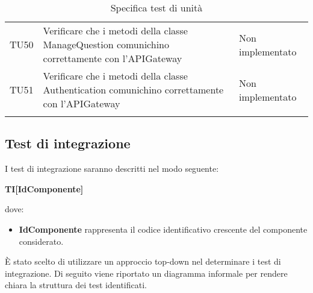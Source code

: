 \documentclass[../PianoDiQualifica.tex]{subfiles}
\begin{document}
\begin{longtable}[c] { >{\centering\arraybackslash}p{4cm} p{7cm} >{\centering\arraybackslash}p{4cm}}
			\addlinespace[0.3em]
			\midrule
			\addlinespace[0.3em]
			TU50 & Verificare che i metodi della classe ManageQuestion comunichino correttamente con l'APIGateway & Non implementato \\
			\addlinespace[0.3em]
			\midrule
			\addlinespace[0.3em]
			TU51 & Verificare che i metodi della classe Authentication comunichino correttamente con l'APIGateway & Non implementato \\ 
		\bottomrule
		\caption{Specifica test di unità}
	\end{longtable}
	
	\newpage
	\subsection{Test di integrazione}
	I test di integrazione saranno descritti nel modo seguente:
	\begin{center}
		\textbf{TI[IdComponente]}
	\end{center}		
	dove:
	\begin{itemize}
		\item \textbf{IdComponente} rappresenta il codice identificativo crescente del componente considerato.
	\end{itemize}
	È stato scelto di utilizzare un approccio top-down nel determinare i test di integrazione. Di seguito viene riportato un diagramma informale per rendere chiara la struttura dei test identificati.
	\\	
\end{document}
